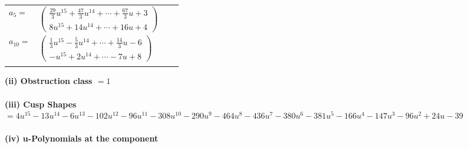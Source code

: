 \documentclass[1p]{elsarticle_modified}
\theoremstyle{definition}
\begin{document}
\begin{tabular}{m{7pt} m{180pt} m{7pt} m{180pt} }
\flushright $a_{5}=$&$\begin{pmatrix}\frac{29}{3} u^{15}+\frac{47}{3} u^{14}+\cdots+\frac{67}{3} u+3\\8 u^{15}+14 u^{14}+\cdots+16 u+4\end{pmatrix}$ \\
\flushright $a_{10}=$&$\begin{pmatrix}\frac{1}{3} u^{15}-\frac{5}{3} u^{14}+\cdots+\frac{14}{3} u-6\\- u^{15}+2 u^{14}+\cdots-7 u+8\end{pmatrix}$\\&\end{tabular}
\flushleft \textbf{(ii) Obstruction class $= 1$}\\~\\
\flushleft \textbf{(iii) Cusp Shapes $= 4 u^{15}-13 u^{14}-6 u^{13}-102 u^{12}-96 u^{11}-308 u^{10}-290 u^9-464 u^8-436 u^7-380 u^6-381 u^5-166 u^4-147 u^3-96 u^2+24 u-39$}\\~\\
\newpage\renewcommand{\arraystretch}{1}
\flushleft \textbf{(iv) u-Polynomials at the component}\newline \\
\end{document}
